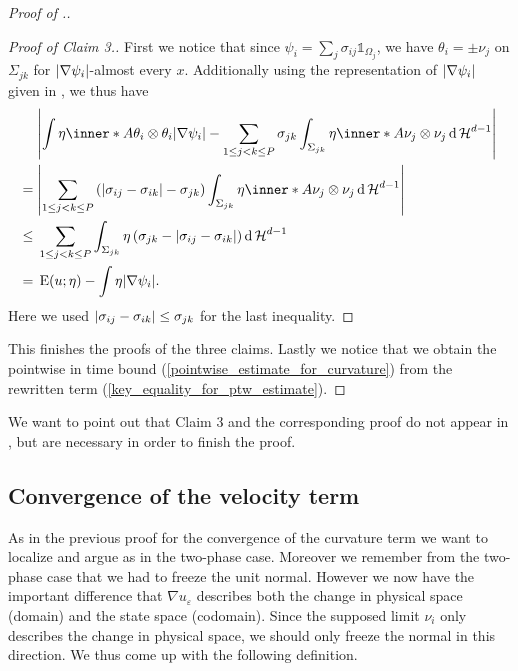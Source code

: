\begin{proof}[Proof of .]
	\begin{proof}[Proof of Claim 3.]
		First we notice that since $ \psi_{ i } = \sum_{ j } \sigma_{ i j } 
		\mathds{ 1 }_{ \Omega_{ j } } $, we have $ \theta_{ i } = \pm \nu_{ j } 
		$ on $ \Sigma_{ j k } $ for $ \abs{ \nabla \psi_{ i } }$-almost 
		every $ x $.
		Additionally using the representation of $ \abs{ \nabla \psi_{ i } } $ 
		given in 
		, we thus have
		\begin{align*}
			&
			\abs{
				\int
				\eta 
				\inner*{ A }
				{ \theta_{ i } \otimes \theta_{ i } }
				\abs{ \nabla \psi_{ i } }
				-
				\sum_{ 1 \leq j < k \leq P }
				\sigma_{ j k }
				\int_{ \Sigma_{ j k } }
				\eta
				\inner*{ A }{ \nu_{ j } \otimes \nu_{ j } }
				\dd{ \hm^{ d - 1 } }
			}
			\\
			={} &
			\abs{ 
				\sum_{ 1 \leq j < k \leq P }
				\left( 
				\abs{ \sigma_{ i j } - \sigma_{ i k } }
				-
				\sigma_{ j k }
				\right)
				\int_{ \Sigma_{ j k  } }
				\eta
				\inner*{ A }{ \nu_{ j } \otimes \nu_{ j } }
				\dd{ \hm^{ d - 1 } }
			}
			\\
			\leq{} &
			\sum_{ 1 \leq j < k \leq P }
			\int_{ \Sigma_{ j k } }
			\eta
			\left(
			\sigma_{ j  k } - \abs{ \sigma_{ i j } - \sigma_{ i 
					k } }
			\right)
			\dd{ \hm^{ d - 1 } }
			\\
			={} &
			\energy ( u ; \eta )
			-
			\int
			\eta
			\abs{ \nabla \psi_{ i } }.
		\end{align*}
		Here we used
		$ \abs{ \sigma_{ i j } - \sigma_{ i k } } \leq \sigma_{ j k } $ for the 
		last inequality.
	\end{proof}
	This finishes the proofs of the three claims. Lastly we notice that we 
	obtain the pointwise in time bound (\ref{pointwise_estimate_for_curvature}) 
	from the rewritten term (\ref{key_equality_for_ptw_estimate}).
\end{proof}

We want to point out that Claim 3 and the corresponding proof do not appear in 
\cite{convergence_of_allen_cahn_equation_to_multiphase_mean_curvature_flow}, 
but are necessary in order to finish the proof.

\subsection{Convergence of the velocity term}

As in the previous proof for the convergence of the curvature term we want to 
localize and argue as in the two-phase case. Moreover we remember from the 
two-phase case that we had to freeze the unit normal. However we now have the 
important difference that $ \nabla u_{ \varepsilon } $ describes both the 
change in physical space (domain) and the state space (codomain). Since the 
supposed limit $ \nu_{ i } $ only describes the change in physical space, we 
should only freeze the normal in this direction. We thus come up with the 
following definition.


